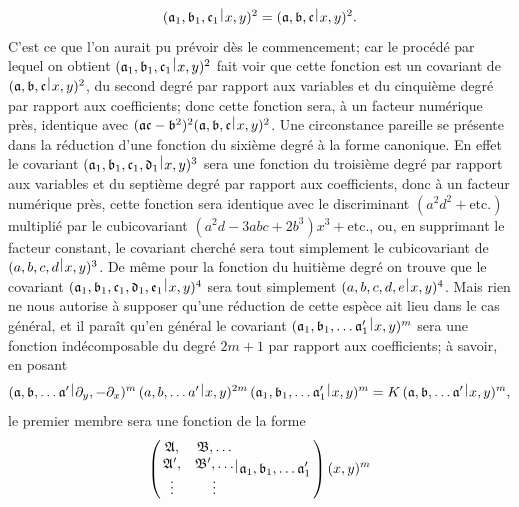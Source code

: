 \documentclass[11pt,a4paper]{book}
\theoremstyle{plain}
\newcommand{\wrule}{\hspace{-0.1em}\mid\hspace{-0.1em}}
\begin{document}
\[
(\mathfrak{a}_1,\mathfrak{b}_1,\mathfrak{c}_1\,\raisebox{0.5ex}{$\wrule$}\,x,y)^2=(\mathfrak{a},\mathfrak{b},\mathfrak{c}\,\raisebox{0.5ex}{$\wrule$}\,x,y)^2.
\]
C'est ce que l'on aurait pu pr\'{e}voir d\`{e}s le commencement; car le proc\'{e}d\'{e} par lequel on obtient $(\mathfrak{a}_1,\mathfrak{b}_1,\mathfrak{c}_1\,\raisebox{0.5ex}{$\wrule$}\,x,y)^2$ fait voir que cette fonction est un covariant de $(\mathfrak{a},\mathfrak{b},\mathfrak{c}\,\raisebox{0.5ex}{$\wrule$}\,x,y)^2$, du second degr\'{e} par rapport aux variables et du cinqui\`{e}me degr\'{e} par rapport aux coefficients; donc cette fonction sera, \`{a} un facteur num\'{e}rique pr\`{e}s, identique avec $(\mathfrak{a}\mathfrak{c}-\mathfrak{b}^2)^2(\mathfrak{a},\mathfrak{b},\mathfrak{c}\,\raisebox{0.5ex}{$\wrule$}\,x,y)^2$. Une circonstance pareille se pr\'{e}sente dans la r\'{e}duction d'une fonction du sixi\`{e}me degr\'{e} \`{a} la forme canonique. En effet le covariant $(\mathfrak{a}_1,\mathfrak{b}_1,\mathfrak{c}_1,\mathfrak{d}_1\,\raisebox{0.5ex}{$\wrule$}\,x,y)^3$ sera une fonction du troisi\`{e}me degr\'{e} par rapport aux variables et du septi\`{e}me degr\'{e} par rapport aux coefficients, donc \`{a} un facteur num\'{e}rique pr\`{e}s, cette fonction sera identique avec le discriminant $(a^2d^2+\text{etc.})$ multipli\'{e} par le cubicovariant $(a^2d-3abc+2b^3)x^3+\text{etc.}$, ou, en supprimant le facteur constant, le covariant cherch\'{e} sera tout simplement le cubicovariant de $(a,b,c,d\,\raisebox{0.5ex}{$\wrule$}\,x,y)^3$. De m\^{e}me pour la fonction du huiti\`{e}me degr\'{e} on trouve que le covariant $(\mathfrak{a}_1,\mathfrak{b}_1,\mathfrak{c}_1,\mathfrak{d}_1,\mathfrak{e}_1\,\raisebox{0.5ex}{$\wrule$}\,x,y)^4$ sera tout simplement $(a,b,c,d,e\,\raisebox{0.5ex}{$\wrule$}\,x,y)^4$. Mais rien ne nous autorise \`{a} supposer qu'une r\'{e}duction de cette esp\`{e}ce ait lieu dans le cas g\'{e}n\'{e}ral, et il para\^{i}t qu'en g\'{e}n\'{e}ral le covariant $(\mathfrak{a}_1,\mathfrak{b}_1,\ldots\mathfrak{a}_1'\,\raisebox{0.5ex}{$\wrule$}\,x,y)^m$ sera une fonction ind\'{e}composable du degr\'{e} $2m+1$ par rapport aux coefficients; \`{a} savoir, en posant
\[
(\mathfrak{a},\mathfrak{b},\ldots\mathfrak{a}'\,\raisebox{0.5ex}{$\wrule$}\,\partial_y,-\partial_x)^m\,(a,b,\ldots a'\,\raisebox{0.5ex}{$\wrule$}\,x,y)^{2m}\,(\mathfrak{a}_1,\mathfrak{b}_1,\ldots\mathfrak{a}_1'\,\raisebox{0.5ex}{$\wrule$}\,x,y)^m=K\,(\mathfrak{a},\mathfrak{b},\ldots\mathfrak{a}'\,\raisebox{0.5ex}{$\wrule$}\,x,y)^m,
\]
le premier membre sera une fonction de la forme
\[
\left(\,\begin{matrix} \mathfrak{A}, & \mathfrak{B},\ldots\\ \mathfrak{A}', & \mathfrak{B}',\ldots\\ \vdots & \vdots \end{matrix}\,\raisebox{0.5ex}{$\wrule$}\,\mathfrak{a}_1,\mathfrak{b}_1,\ldots\mathfrak{a}_1'\,\right)(x,y)^m
\]
\end{document}
